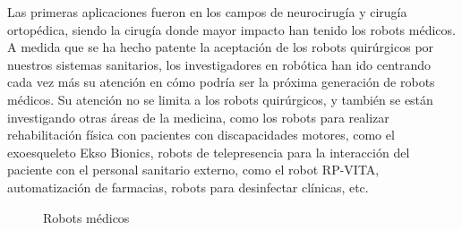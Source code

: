 Las primeras aplicaciones fueron en los campos de neurocirugía y cirugía ortopédica, siendo la cirugía donde mayor impacto han tenido los robots médicos. A medida que se ha hecho patente la aceptación de los robots quirúrgicos por nuestros sistemas sanitarios, los investigadores en robótica han ido centrando cada vez más su atención en cómo podría ser la próxima generación de robots médicos. Su atención no se limita a los robots quirúrgicos, y también se están investigando otras áreas de la medicina, como los robots para realizar rehabilitación física con pacientes con discapacidades motores, como el exoesqueleto Ekso Bionics, robots de telepresencia para la interacción del paciente con el personal sanitario externo, como el robot RP-VITA, automatización de farmacias, robots para desinfectar clínicas, etc. \cite{Dupont21}\\

 \begin{figure}[H]
    \begin{center}
      \subcapcentertrue
      \hspace{20mm}
    \end{center}
    \caption{Robots médicos}
    \label{fig:Robots_medicos}
  \end{figure}

